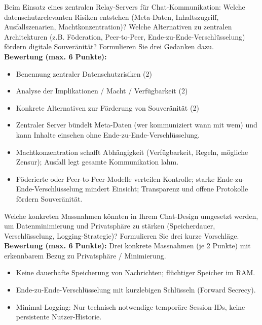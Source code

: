 \begin{myexercise}
    Beim Einsatz eines zentralen Relay-Servers für Chat-Kommunikation: Welche datenschutzrelevanten Risiken entstehen (Meta-Daten, Inhaltszugriff, Ausfallszenarien, Machtkonzentration)? Welche Alternativen zu zentralen Architekturen (z.B. Föderation, Peer-to-Peer, Ende-zu-Ende-Verschlüsselung) fördern digitale Souveränität? Formulieren Sie drei Gedanken dazu.
    \\[.5cm]
    \textbf{Bewertung (max. 6 Punkte):}
    \begin{itemize}
        \item Benennung zentraler Datenschutzrisiken (2)
        \item Analyse der Implikationen / Macht / Verfügbarkeit (2)
        \item Konkrete Alternativen zur Förderung von Souveränität (2)
    \end{itemize}
    \begin{myanswer}
        \begin{itemize}
            \item Zentraler Server bündelt Meta-Daten (wer kommuniziert wann mit wem) und kann Inhalte einsehen ohne Ende-zu-Ende-Verschlüsselung.
            \item Machtkonzentration schafft Abhängigkeit (Verfügbarkeit, Regeln, mögliche Zensur); Ausfall legt gesamte Kommunikation lahm.
            \item Föderierte oder Peer-to-Peer-Modelle verteilen Kontrolle; starke Ende-zu-Ende-Verschlüsselung mindert Einsicht; Transparenz und offene Protokolle fördern Souveränität.
        \end{itemize}
    \end{myanswer}
\end{myexercise}

\begin{myexercise}
    Welche konkreten Massnahmen könnten in Ihrem Chat-Design umgesetzt werden, um Datenminimierung und Privatsphäre zu stärken (Speicherdauer, Verschlüsselung, Logging-Strategie)? Formulieren Sie drei kurze Vorschläge.
    \\[.5cm]
    \textbf{Bewertung (max. 6 Punkte):} Drei konkrete Massnahmen (je 2 Punkte) mit erkennbarem Bezug zu Privatsphäre / Minimierung.
    \begin{myanswer}
        \begin{itemize}
            \item Keine dauerhafte Speicherung von Nachrichten; flüchtiger Speicher im RAM.
            \item Ende-zu-Ende-Verschlüsselung mit kurzlebigen Schlüsseln (Forward Secrecy).
            \item Minimal-Logging: Nur technisch notwendige temporäre Session-IDs, keine persistente Nutzer-Historie.
        \end{itemize}
    \end{myanswer}
\end{myexercise}

